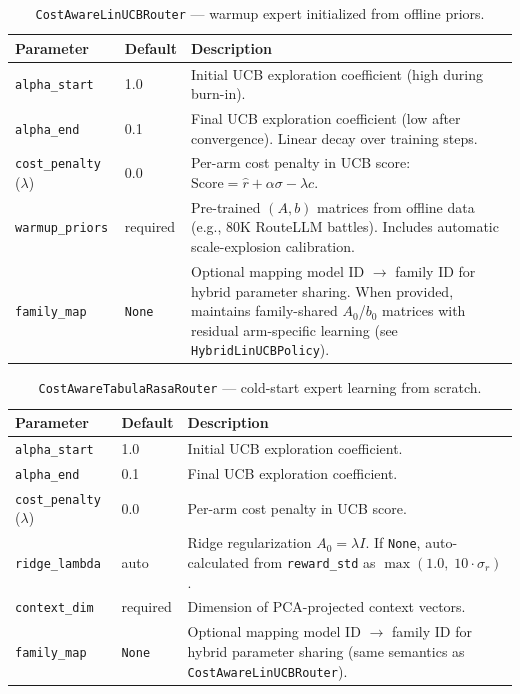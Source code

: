 
\begin{table}[h]
\centering
\caption{\texttt{CostAwareLinUCBRouter} --- warmup expert initialized from offline priors.}
\label{tab:warmup_library}
\small
\begin{tabular}{@{}llp{6.8cm}@{}}
\toprule
\textbf{Parameter} & \textbf{Default} & \textbf{Description} \\
\midrule
\texttt{alpha\_start} & 1.0 & Initial UCB exploration coefficient (high during burn-in). \\
\texttt{alpha\_end} & 0.1 & Final UCB exploration coefficient (low after convergence). Linear decay over training steps. \\
\texttt{cost\_penalty} ($\lambda$) & 0.0 & Per-arm cost penalty in UCB score: $\text{Score} = \hat{r} + \alpha\sigma - \lambda c$. \\
\texttt{warmup\_priors} & required & Pre-trained $(A, b)$ matrices from offline data (e.g., 80K RouteLLM battles). Includes automatic scale-explosion calibration. \\
\texttt{family\_map} & \texttt{None} & Optional mapping model ID $\to$ family ID for hybrid parameter sharing. When provided, maintains family-shared $A_0$/$b_0$ matrices with residual arm-specific learning (see \texttt{HybridLinUCBPolicy}). \\
\bottomrule
\end{tabular}
\end{table}


\begin{table}[h]
\centering
\caption{\texttt{CostAwareTabulaRasaRouter} --- cold-start expert learning from scratch.}
\label{tab:tabula_library}
\small
\begin{tabular}{@{}llp{6.8cm}@{}}
\toprule
\textbf{Parameter} & \textbf{Default} & \textbf{Description} \\
\midrule
\texttt{alpha\_start} & 1.0 & Initial UCB exploration coefficient. \\
\texttt{alpha\_end} & 0.1 & Final UCB exploration coefficient. \\
\texttt{cost\_penalty} ($\lambda$) & 0.0 & Per-arm cost penalty in UCB score. \\
\texttt{ridge\_lambda} & auto & Ridge regularization $A_0 = \lambda I$. If \texttt{None}, auto-calculated from \texttt{reward\_std} as $\max(1.0,\; 10 \cdot \sigma_r)$. \\
\texttt{context\_dim} & required & Dimension of PCA-projected context vectors. \\
\texttt{family\_map} & \texttt{None} & Optional mapping model ID $\to$ family ID for hybrid parameter sharing (same semantics as \texttt{CostAwareLinUCBRouter}). \\
\bottomrule
\end{tabular}
\end{table}

